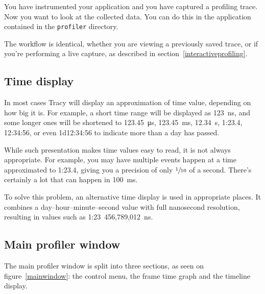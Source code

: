 \documentclass[hidelinks,titlepage,a4paper]{article}
\begin{document}
You have instrumented your application and you have captured a profiling trace. Now you want to look at the collected data. You can do this in the application contained in the \texttt{profiler} directory.

The workflow is identical, whether you are viewing a previously saved trace, or if you're performing a live capture, as described in section~\ref{interactiveprofiling}.

\subsection{Time display}

In most cases Tracy will display an approximation of time value, depending on how big it is. For example, a short time range will be displayed as 123~\si{\nano\second}, and some longer ones will be shortened to 123.45~\si{\micro\second}, 123.45~\si{\milli\second}, 12.34~\si{\second}, 1:23.4, 12:34:56, or even 1d12:34:56 to indicate more than a day has passed.

While such presentation makes time values easy to read, it is not always appropriate. For example, you may have multiple events happen at a time approximated to 1:23.4, giving you a precision of only $\sfrac{1}{10}$ of a second. There's certainly a lot that can happen in 100~\si{\milli\second}.

To solve this problem, an alternative time display is used in appropriate places. It combines a day--hour--minute--second value with full nanosecond resolution, resulting in values such as 1:23~456,789,012~\si{\nano\second}.

\subsection{Main profiler window}

The main profiler window is split into three sections, as seen on figure~\ref{mainwindow}: the control menu, the frame time graph and the timeline display.
\end{document}

